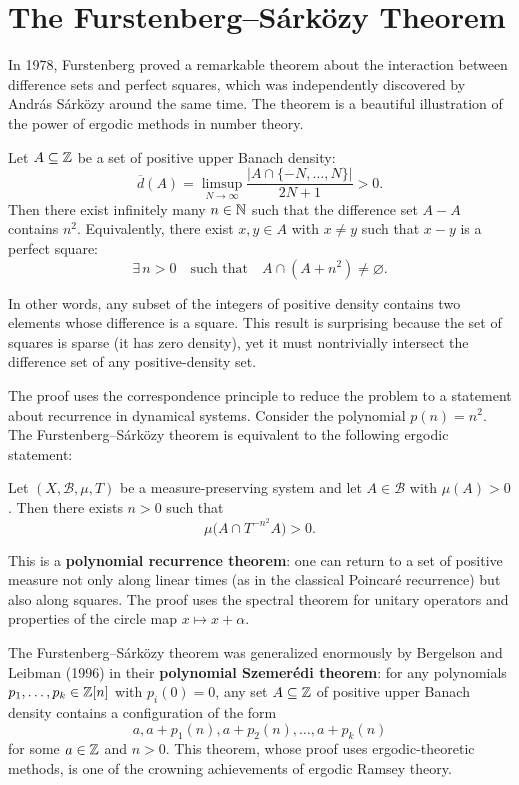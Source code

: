 \section{The Furstenberg--S\'ark\"ozy Theorem}

In 1978, Furstenberg proved a remarkable theorem about the interaction between difference sets and perfect squares, which was independently discovered by Andr\'as S\'ark\"ozy around the same time. The theorem is a beautiful illustration of the power of ergodic methods in number theory.

\begin{theorem}
Let \(A \subseteq \mathbb{Z}\) be a set of positive upper Banach density:
\[
\overline{d}(A) = \limsup_{N \to \infty} \frac{|A \cap \{-N,\dots,N\}|}{2N+1} > 0.
\]
Then there exist infinitely many \(n \in \mathbb{N}\) such that the difference set \(A - A\) contains \(n^2\). Equivalently, there exist \(x,y \in A\) with \(x \neq y\) such that \(x - y\) is a perfect square:
\[
\exists\, n > 0 \quad \text{such that} \quad A \cap (A + n^2) \neq \varnothing.
\]
\end{theorem}

In other words, any subset of the integers of positive density contains two elements whose difference is a square. This result is surprising because the set of squares is sparse (it has zero density), yet it must nontrivially intersect the difference set of any positive-density set.

The proof uses the correspondence principle to reduce the problem to a statement about recurrence in dynamical systems. Consider the polynomial \(p(n) = n^2\). The Furstenberg--S\'ark\"ozy theorem is equivalent to the following ergodic statement:

\begin{theorem}
Let \((X,\mathscr{B},\mu,T)\) be a measure-preserving system and let \(A \in \mathscr{B}\) with \(\mu(A) > 0\). Then there exists \(n > 0\) such that
\[
\mu\bigl(A \cap T^{-n^2} A\bigr) > 0.
\]
\end{theorem}

This is a \textbf{polynomial recurrence theorem}: one can return to a set of positive measure not only along linear times (as in the classical Poincar\'e recurrence) but also along squares. The proof uses the spectral theorem for unitary operators and properties of the circle map \(x \mapsto x + \alpha\).

The Furstenberg--S\'ark\"ozy theorem was generalized enormously by Bergelson and Leibman (1996) in their \textbf{polynomial Szemer\'edi theorem}: for any polynomials \(p_1,\dots,p_k \in \mathbb{Z}[n]\) with \(p_i(0) = 0\), any set \(A \subseteq \mathbb{Z}\) of positive upper Banach density contains a configuration of the form
\[
a, a + p_1(n), a + p_2(n), \dots, a + p_k(n)
\]
for some \(a \in \mathbb{Z}\) and \(n > 0\). This theorem, whose proof uses ergodic-theoretic methods, is one of the crowning achievements of ergodic Ramsey theory.

